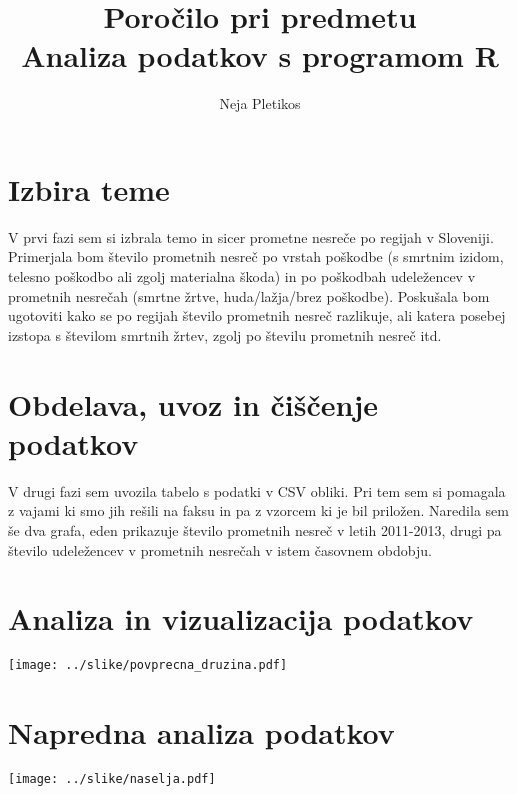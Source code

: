 \documentclass[11pt,a4paper]{article}
\begin{document}
\title{Poročilo pri predmetu \\
Analiza podatkov s programom R}
\author{Neja Pletikos}
\maketitle

\section{Izbira teme}

V prvi fazi sem si izbrala temo in sicer prometne nesreče po regijah v Sloveniji. Primerjala bom število prometnih nesreč po vrstah poškodbe (s smrtnim izidom, telesno poškodbo ali zgolj materialna škoda) in po poškodbah udeležencev v prometnih nesrečah (smrtne žrtve, huda/lažja/brez poškodbe). Poskušala bom ugotoviti kako se po regijah število prometnih nesreč razlikuje, ali katera posebej izstopa s številom smrtnih žrtev, zgolj po številu prometnih nesreč itd.

\section{Obdelava, uvoz in čiščenje podatkov}

V drugi fazi sem uvozila tabelo s podatki v CSV obliki. Pri tem sem si pomagala z vajami ki smo jih rešili na faksu in pa z vzorcem ki je bil priložen. Naredila sem še dva grafa, eden prikazuje število prometnih nesreč v letih 2011-2013, drugi pa število udeležencev v prometnih nesrečah v istem časovnem obdobju.

\section{Analiza in vizualizacija podatkov}

\texttt{[image: ../slike/povprecna\_druzina.pdf]}

\section{Napredna analiza podatkov}

\texttt{[image: ../slike/naselja.pdf]}
\end{document}

